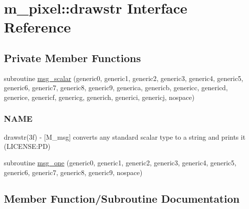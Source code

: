 \hypertarget{interfacem__pixel_1_1drawstr}{}\section{m\+\_\+pixel\+:\+:drawstr Interface Reference}
\label{interfacem__pixel_1_1drawstr}
\subsection*{Private Member Functions}
\begin{DoxyCompactItemize}
\item 
subroutine \mbox{\hyperlink{interfacem__pixel_1_1drawstr_a09631abb575f4e9c56f28228f97cd896}{msg\+\_\+scalar}} (generic0, generic1, generic2, generic3, generic4, generic5, generic6, generic7, generic8, generic9, generica, genericb, genericc, genericd, generice, genericf, genericg, generich, generici, genericj, nospace)
\begin{DoxyCompactList}\small\item\em \subsubsection*{N\+A\+ME}

drawstr(3f) -\/ \mbox{[}M\+\_\+msg\mbox{]} converts any standard scalar type to a string and prints it (L\+I\+C\+E\+N\+SE\+:PD) \end{DoxyCompactList}\item 
subroutine \mbox{\hyperlink{interfacem__pixel_1_1drawstr_ae8691c6c203ee9b2f71a835830f2e194}{msg\+\_\+one}} (generic0, generic1, generic2, generic3, generic4, generic5, generic6, generic7, generic8, generic9, nospace)
\end{DoxyCompactItemize}


\subsection{Member Function/\+Subroutine Documentation}
\mbox{\label{interfacem__pixel_1_1drawstr_ae8691c6c203ee9b2f71a835830f2e194}} 
